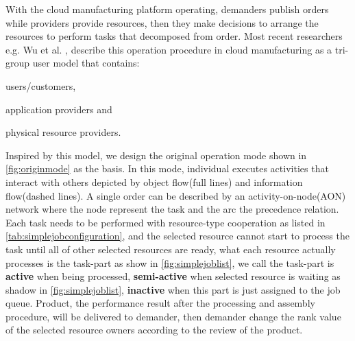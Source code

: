 With the cloud manufacturing platform operating, demanders publish orders while providers provide resources, then they make decisions to  arrange the resources to perform tasks that decomposed from order. Most recent researchers e.g. Wu et al. \cite{Wu2013}, describe this operation procedure in cloud manufacturing as a tri-group user model that contains:\begin{inparaenum}[1)]
\item users/customers,
\item application providers and
\item physical resource providers.
\end{inparaenum}
Inspired by this model, we design the original operation mode shown in \autoref{fig:originmode} as the basis.
In this mode, individual executes activities that interact with others depicted by object flow(full lines) and information flow(dashed lines). A single order can be described by an activity-on-node(AON) network where the node represent the task and the arc the precedence relation. Each task needs to be performed with resource-type cooperation as listed in \autoref{tab:simplejobconfiguration}, and the selected resource cannot start to process the task until all of other selected resources are ready, what each resource actually processes is the task-part as show in \autoref{fig:simplejoblist}, we call the task-part is \textbf{active} when being processed, \textbf{semi-active} when selected resource is waiting as shadow in \autoref{fig:simplejoblist}, \textbf{inactive} when this part is just assigned to the job queue. Product, the performance result after the processing and assembly procedure, will be delivered to demander, then demander change the rank value of the selected resource owners according to the review of the product. 


